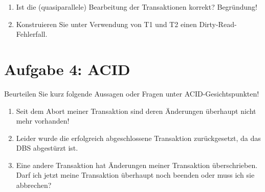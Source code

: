 \documentclass{lehramt-informatik-haupt}
\begin{document}
\begin{enumerate}

%

\item Ist die (quasiparallele) Bearbeitung der Transaktionen korrekt?
Begründung!

%

\item Konstruieren Sie unter Verwendung von T1 und T2 einen
Dirty-Read-Fehlerfall.
\end{enumerate}

%

\section{Aufgabe 4: ACID}

Beurteilen Sie kurz folgende Aussagen oder Fragen unter
ACID-Gesichtspunkten!

\begin{enumerate}


\item Seit dem Abort meiner Transaktion sind deren Änderungen überhaupt
nicht mehr vorhanden!


\item Leider wurde die erfolgreich abgeschlossene Transaktion
zurückgesetzt, da das DBS abgestürzt ist.


\item Eine andere Transaktion hat Änderungen meiner Transaktion
überschrieben. Darf ich jetzt meine Transaktion überhaupt noch beenden
oder muss ich sie abbrechen?
\end{enumerate}

%



%


\end{document}
